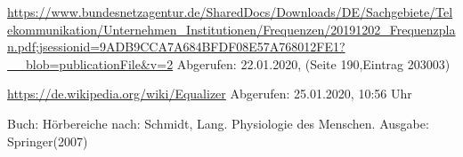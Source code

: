 \begin{thebibliography}{99}

 \url{https://www.bundesnetzagentur.de/SharedDocs/Downloads/DE/Sachgebiete/Telekommunikation/Unternehmen_Institutionen/Frequenzen/20191202_Frequenzplan.pdf;jsessionid=9ADB9CCA7A684BFDF08E57A768012FE1?__blob=publicationFile&v=2} Abgerufen: 22.01.2020, (Seite 190,Eintrag 203003)

 \url{https://de.wikipedia.org/wiki/Equalizer} Abgerufen: 25.01.2020, 10:56 Uhr

 Buch: Hörbereiche nach: Schmidt, Lang. Physiologie des Menschen. Ausgabe: Springer(2007)






\end{thebibliography}
